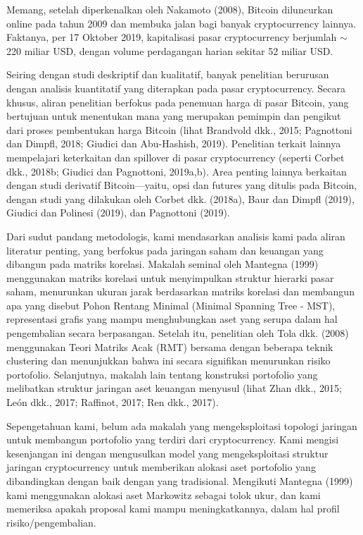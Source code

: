 \documentclass[12pt,a4paper]{article}
\begin{document}
Memang, setelah diperkenalkan oleh Nakamoto (2008)\cite{nakamoto2008}, Bitcoin diluncurkan online pada tahun 2009 dan membuka jalan bagi banyak cryptocurrency lainnya. Faktanya, per 17 Oktober 2019, kapitalisasi pasar cryptocurrency berjumlah $\sim$220 miliar USD, dengan volume perdagangan harian sekitar 52 miliar USD.

Seiring dengan studi deskriptif dan kualitatif, banyak penelitian berurusan dengan analisis kuantitatif yang diterapkan pada pasar cryptocurrency. Secara khusus, aliran penelitian berfokus pada penemuan harga di pasar Bitcoin, yang bertujuan untuk menentukan mana yang merupakan pemimpin dan pengikut dari proses pembentukan harga Bitcoin (lihat Brandvold dkk., 2015\cite{brandvold2015}; Pagnottoni dan Dimpfl, 2018\cite{pagnottoni2018}; Giudici dan Abu-Hashish, 2019\cite{giudici2019a}). Penelitian terkait lainnya mempelajari keterkaitan dan spillover di pasar cryptocurrency (seperti Corbet dkk., 2018b\cite{corbet2018b}; Giudici dan Pagnottoni, 2019a,b\cite{giudici2019b,giudici2019c}). Area penting lainnya berkaitan dengan studi derivatif Bitcoin—yaitu, opsi dan futures yang ditulis pada Bitcoin, dengan studi yang dilakukan oleh Corbet dkk. (2018a)\cite{corbet2018a}, Baur dan Dimpfl (2019)\cite{baur2019}, Giudici dan Polinesi (2019)\cite{giudici2019d}, dan Pagnottoni (2019)\cite{pagnottoni2019}.

Dari sudut pandang metodologis, kami mendasarkan analisis kami pada aliran literatur penting, yang berfokus pada jaringan saham dan keuangan yang dibangun pada matriks korelasi. Makalah seminal oleh Mantegna (1999)\cite{mantegna1999} menggunakan matriks korelasi untuk menyimpulkan struktur hierarki pasar saham, menurunkan ukuran jarak berdasarkan matriks korelasi dan membangun apa yang disebut Pohon Rentang Minimal (Minimal Spanning Tree - MST), representasi grafis yang mampu menghubungkan aset yang serupa dalam hal pengembalian secara berpasangan. Setelah itu, penelitian oleh Tola dkk. (2008)\cite{tola2008} menggunakan Teori Matriks Acak (RMT) bersama dengan beberapa teknik clustering dan menunjukkan bahwa ini secara signifikan menurunkan risiko portofolio. Selanjutnya, makalah lain tentang konstruksi portofolio yang melibatkan struktur jaringan aset keuangan menyusul (lihat Zhan dkk., 2015\cite{zhan2015}; León dkk., 2017\cite{leon2017}; Raffinot, 2017\cite{raffinot2017}; Ren dkk., 2017\cite{ren2017}).

Sepengetahuan kami, belum ada makalah yang mengeksploitasi topologi jaringan untuk membangun portofolio yang terdiri dari cryptocurrency. Kami mengisi kesenjangan ini dengan mengusulkan model yang mengeksploitasi struktur jaringan cryptocurrency untuk memberikan alokasi aset portofolio yang dibandingkan dengan baik dengan yang tradisional. Mengikuti Mantegna (1999)\cite{mantegna1999} kami menggunakan alokasi aset Markowitz sebagai tolok ukur, dan kami memeriksa apakah proposal kami mampu meningkatkannya, dalam hal profil risiko/pengembalian.
\end{document}
